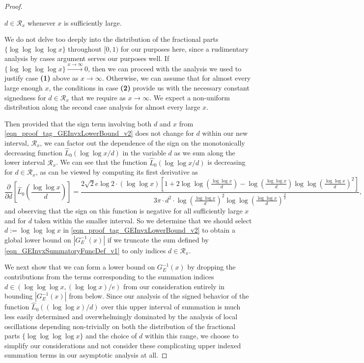 \documentclass[11pt,reqno,a4letter]{article}
\numberwithin{figure}{section}
\numberwithin{table}{section}
\theoremstyle{plain}
\numberwithin{theorem}{section}
\theoremstyle{definition}
\begin{document}
\begin{proof}
\begin{itemize}[itemsep=0pt,topsep=0pt,leftmargin=0.25in]
     $d \in \mathcal{R}_x$ whenever $x$ is sufficiently large. 
\end{itemize} 
We do not delve too deeply into the distribution of the fractional parts $\{\log\log\log\log x\}$ 
throughout $[0, 1)$ 
for our purposes here, since a rudimentary analysis by cases argument serves our purposes well. 
If $\{\log\log\log\log x\} \xrightarrow{x \rightarrow \infty} 0$, then we can proceed with the analysis we used to 
justify case \textbf{(1)} above as $x \rightarrow \infty$. Otherwise, we can assume that for almost every 
large enough $x$, the conditions in case \textbf{(2)} provide us with the necessary constant signedness for 
$d \in \mathcal{R}_x$ that we require as $x \rightarrow \infty$. 
We expect a non-uniform distribution along the second case analysis for almost every large $x$. 

Then provided that the sign term involving both $d$ and $x$ 
from \eqref{eqn_proof_tag_GEInvxLowerBound_v2} does not change for $d$ within our new interval, 
$\mathcal{R}_x$, 
we can factor out the dependence of the sign on the monotonically 
decreasing function $\widehat{L}_0\left(\log\log x / d\right)$ in the variable $d$ as we 
sum along the lower interval $\mathcal{R}_x$. 
We can see that the function $\widehat{L}_0\left(\log\log x / d\right)$ is decreasing 
for $d \in \mathcal{R}_x$, as can be viewed by computing its first 
derivative as 
\[
\frac{\partial}{\partial d}\left[\widehat{L}_0\left(\frac{\log\log x}{d}\right) \right] = 
     \frac{2\sqrt{2} e \log 2 \cdot (\log\log x) \left[ 
     1 + 2 \log\log\left(\frac{\log\log x}{d}\right) - 
     \log\left(\frac{\log\log x}{d}\right) \log\log\left(\frac{\log\log x}{d}\right)^2 
     \right]}{3\pi \cdot d^2 \cdot 
     \log\left(\frac{\log\log x}{d}\right)^2 \log\log\left(\frac{\log\log x}{d}\right)^{\frac{3}{2}}}, 
\]
and observing that the sign on this function is negative for all sufficiently large $x$ 
and for $d$ taken within the smaller interval. 
So we determine that we should select $d := \log\log\log x$ in 
\eqref{eqn_proof_tag_GEInvxLowerBound_v2} to 
obtain a global lower bound on $|G_E^{-1}(x)|$ if we truncate the sum 
defined by \eqref{eqn_GEInvxSummatoryFuncDef_v1} to only indices $d \in \mathcal{R}_x$. 

We next show that we can form a lower bound on $G_E^{-1}(x)$ by dropping the contributions 
from the terms corresponding to the summation indices 
$d \in \left(\log\log\log x, (\log\log x) / e\right)$ from our consideration entirely in 
bounding $|G_E^{-1}(x)|$ from below. 
Since our analysis of the signed behavior of the function 
$\widehat{L}_0\left((\log\log x) / d\right)$ over this upper interval of summation is much less 
easily determined and overwhelmingly dominated by the analysis of 
local oscillations depending non-trivially on both the distribution of the fractional parts 
$\{\log\log\log\log x\}$ and the choice of $d$ within this range, we choose to simplify our considerations 
and not consider these complicating upper indexed summation terms in our asymptotic analysis at all. 


\end{proof}
\end{document}
